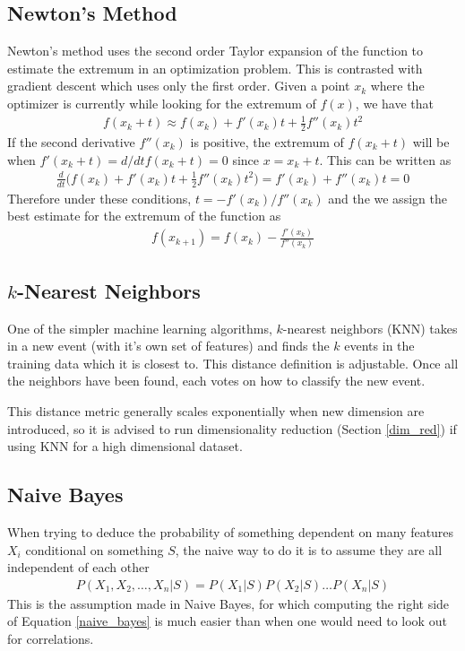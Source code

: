 \subsection{Newton's Method}
Newton's method uses the second order Taylor expansion of the function to estimate the extremum in an optimization problem. This is contrasted with gradient descent which uses only the first order. Given a point $x_k$ where the optimizer is currently while looking for the extremum of $f(x)$, we have that
\begin{align}
	f(x_k+t)\approx f(x_k) + f'(x_k)t + \frac{1}{2}f''(x_k)t^2
\end{align}
If the second derivative $f''(x_k)$ is positive, the extremum of $f(x_k+t)$ will be when $f'(x_k+t) = d/dt f(x_k+t) = 0$ since $x=x_k+t$. This can be written as 
\begin{align}
	\frac{d}{dt}\Big( f(x_k) + f'(x_k)t + \frac{1}{2}f''(x_k)t^2\Big) = f'(x_k)+f''(x_k)t = 0 
\end{align}
Therefore under these conditions, $t = -f'(x_k)/f''(x_k)$ and the we assign the best estimate for the extremum of the function as
\begin{align}
	f(x_{k+1}) = f(x_k)-\frac{f'(x_k)}{f''(x_k)}
\end{align} 


\subsection{$k$-Nearest Neighbors}\label{sub:knn}
One of the simpler machine learning algorithms, $k$-nearest neighbors (KNN) takes in a new event (with it's own set of features) and finds the  $k$ events in the training data which it is closest to. This distance definition is adjustable. Once all the neighbors have been found, each votes on how to classify the new event.

This distance metric generally scales exponentially when new dimension are introduced, so it is advised to run dimensionality reduction (Section \ref{dim_red}) if using KNN for a high dimensional dataset.
\subsection{Naive Bayes}
When trying to deduce the probability of something dependent on many features $X_i$ conditional on something $S$, the naive way to do it is to assume they are all independent of each other
\begin{align}\label{naive_bayes}
	P(X_1,X_2,\dots,X_n|S) = P(X_1|S)P(X_2|S)\dots P(X_n|S)
\end{align}
This is the assumption made in Naive Bayes, for which computing the right side of Equation \ref{naive_bayes} is much easier than when one would need to look out for correlations.

